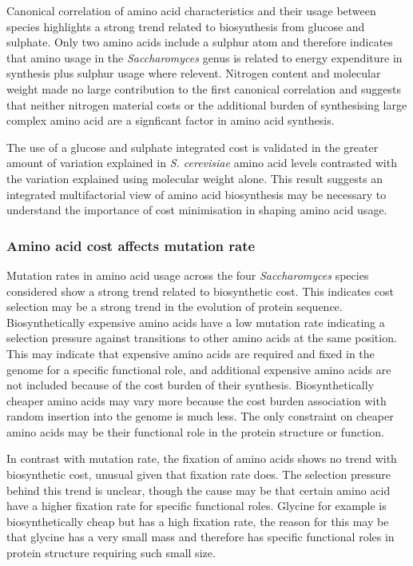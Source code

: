 Canonical correlation of amino acid characteristics and their usage between species highlights a strong trend related to biosynthesis from glucose and sulphate. Only two amino acids include a sulphur atom and therefore indicates that amino usage in the \emph{Saccharomyces} genus is related to energy expenditure in synthesis plus sulphur usage where relevent. Nitrogen content and molecular weight made no large contribution to the first canonical correlation and suggests that neither nitrogen material costs or the additional burden of synthesising large complex amino acid are a signficant factor in amino acid synthesis.

The use of a glucose and sulphate integrated cost is validated in the greater amount of variation explained in \emph{S. cerevisiae} amino acid levels contrasted with the variation explained using molecular weight alone. This result suggests an integrated multifactorial view of amino acid biosynthesis may be necessary to understand the importance of cost minimisation in shaping amino acid usage.

\subsubsection{Amino acid cost affects mutation rate}

Mutation rates in amino acid usage across the four \emph{Saccharomyces} species considered show a strong trend related to biosynthetic cost. This indicates cost selection may be a strong trend in the evolution of protein sequence. Biosynthetically expensive amino acids have a low mutation rate indicating a selection pressure against transitions to other amino acids at the same position. This may indicate that expensive amino acids are required and fixed in the genome for a specific functional role, and additional expensive amino acids are not included because of the cost burden of their synthesis. Biosynthetically cheaper amino acids may vary more because the cost burden association with random insertion into the genome is much less. The only constraint on cheaper amino acids may be their functional role in the protein structure or function.

In contrast with mutation rate, the fixation of amino acids shows no trend with biosynthetic cost, unusual given that fixation rate does. The selection pressure behind this trend is unclear, though the cause may be that certain amino acid have a higher fixation rate for specific functional roles. Glycine for example is biosynthetically cheap but has a high fixation rate, the reason for this may be that glycine has a very small mass and therefore has specific functional roles in protein structure requiring such small size.

